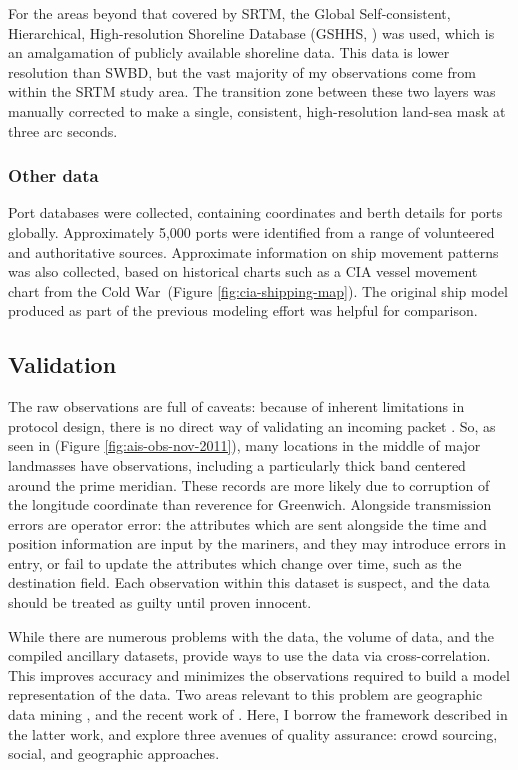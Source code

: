 \documentclass[12pt,letterpaper]{article}
\begin{document}
For the areas beyond that covered by SRTM, the Global Self-consistent, Hierarchical, High-resolution Shoreline Database (GSHHS, \citealp{wessel1996global}) was used, which is an amalgamation of publicly available shoreline data. This data is lower resolution than SWBD, but the vast majority of my observations come from within the SRTM study area. The transition zone between these two layers was manually corrected to make a single, consistent, high-resolution land-sea mask at three arc seconds.

\subsubsection{Other data}
Port databases were collected, containing coordinates and berth details for ports globally. Approximately 5,000 ports were identified from a range of volunteered and authoritative sources.  Approximate information on ship movement patterns was also collected, based on historical charts such as a CIA vessel movement chart from the Cold War~(Figure \ref{fig:cia-shipping-map}). The original ship model produced as part of the previous modeling effort \citep{Halpern2008} was helpful for comparison.

\subsection{Validation}

The raw observations are full of caveats: because of inherent limitations in protocol design, there is no direct way of validating an incoming packet \citep{RaymondInPress}. So, as seen in (Figure \ref{fig:ais-obs-nov-2011}), many locations in the middle of major landmasses have observations, including a particularly thick band centered around the prime meridian. These records are more likely due to corruption of the longitude coordinate than reverence for Greenwich. Alongside transmission errors are operator error: the attributes which are sent alongside the time and position information are input by the mariners, and they may introduce errors in entry, or fail to update the attributes which change over time, such as the destination field. Each observation within this dataset is suspect, and the data should be treated as guilty until proven innocent.

While there are numerous problems with the data, the volume of data, and the compiled ancillary datasets, provide ways to use the data via cross-correlation. This improves accuracy and minimizes the observations required to build a model representation of the data. Two areas relevant to this problem are geographic data mining \citep{miller2009geographic}, and the recent work of \cite{goodchildli2012}. Here, I borrow the framework described in the latter work, and explore three avenues of quality assurance: crowd sourcing, social, and geographic approaches.
\end{document}

